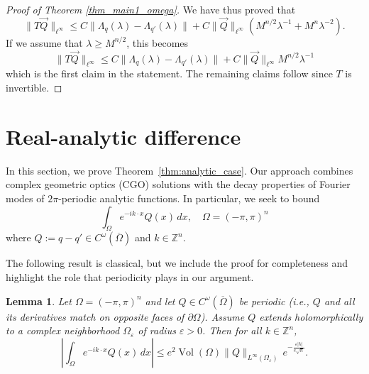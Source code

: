 \documentclass[a4paper, 11pt, twoside, notitlepage]{amsart}
\newtheorem{lemma}[theorem]{Lemma}
\theoremstyle{definition}
\theoremstyle{remark}
\newcommand{\norm}[1]{\lVert #1 \rVert}
\begin{document}
\begin{proof}[Proof of Theorem \ref{thm_main1_omega}]
We have thus proved that 
\[
\norm{T \vec{Q}}_{\ell^{\infty}} \leq C \|\Lambda_q(\lambda)-\Lambda_{q'}(\lambda)\| + C \norm{\vec{Q}}_{\ell^{\infty}} (M^{n/2} \lambda^{-1} + M^n \lambda^{-2}).
\]
If we assume that $\lambda \geq M^{n/2}$, this becomes 
\[
\norm{T \vec{Q}}_{\ell^{\infty}} \leq C \|\Lambda_q(\lambda)-\Lambda_{q'}(\lambda)\| + C \norm{\vec{Q}}_{\ell^{\infty}} M^{n/2} \lambda^{-1}
\]
which is the first claim in the statement. The remaining claims follow since $T$ is invertible.
\end{proof}




\section{Real-analytic difference} \label{sec_real_analytic}

In this section, we prove Theorem~\ref{thm:analytic_case}. Our approach combines 
complex geometric optics (CGO) solutions with the decay properties of Fourier modes 
of $2\pi$-periodic analytic functions. In particular, we seek to bound
\begin{equation}
\int_\Omega e^{-ik\cdot x} Q(x) \, dx, \quad \Omega=(-\pi,\pi)^n
\end{equation}
where $Q := q - q' \in C^\omega(\overline{\Omega})$ and $k \in \mathbb{Z}^n$.

The following result is classical, but we include the proof for completeness and highlight the role that periodicity plays in our argument.

\begin{lemma}\label{Fourier_restriction_decay}
Let $\Omega = (-\pi, \pi)^n$ and let $Q \in C^\omega(\overline{\Omega})$ be periodic 
(i.e., $Q$ and all its derivatives match on opposite faces of $\partial\Omega$). 
Assume $Q$ extends holomorphically to a complex neighborhood $\Omega_\varepsilon$ 
of radius $\varepsilon > 0$. Then for all $k \in \mathbb{Z}^n$,
\begin{equation}\label{eq:Fourier_mode_analytic_decay}
\left| \int_\Omega e^{-ik\cdot x} Q(x) \, dx \right| 
\leq e^2 \operatorname{Vol}(\Omega) \|Q\|_{L^\infty(\Omega_\varepsilon)} \, 
e^{-\frac{\varepsilon |k|}{e\sqrt{n}}}.
\end{equation}
\end{lemma}
\end{document}
